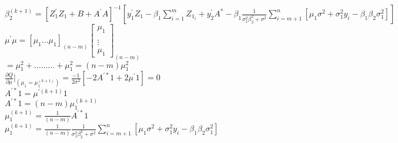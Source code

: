 \documentclass{article}\usepackage[]{graphicx}\usepackage[]{color}
\begin{document}
$\beta_{2}^{(k+1)}=[Z_{1}^{\prime}Z_{1}+B+A^{\prime}A]^{-1}\left [y_{1}^{\prime}Z_{1}-\beta_{1}\sum_{i=1}^{m}Z_{1_{i}}+y_{2}^{\prime}A^{*}-\beta_{1}\frac{1}{\sigma^{2}_{1}\beta_{2}^{2}+\sigma^{2}}\sum_{i=m+1}^{n}\left[\mu_{1}\sigma^{2}+\sigma_{1}^{2}y_{i}-\beta_{1}\beta_{2}\sigma_{1}^{2} \right] \right]$  \vspace{5mm}\\



${\mu^{\prime}\mu}=\left[\mu_{1}\ldots \mu_{1}  \right]_{(n-m)}\left[\begin{array}{c} \mu_{1} \\ \\ \vdots \\ \mu_{1} \end{array} \right]_{(n-m)}$
\vspace{5mm}\\


$=\mu_{1}^{2}+\dots \dots   \ldots + \mu_{1}^{2}=(n-m)\mu_{1}^{2}$\\

$\frac{\partial Q}{\partial \mu{}}|_{(\mu_{1}=\mu_{1}^{(k+1)})}=\frac{-1}{2\sigma^{2}}\left[  -2A^{\prime *}1 +2\mu^{\prime} 1\right]=0$\\


$A^{\prime *}1 =\mu^{\prime(k+1)} 1$\\

$A^{\prime *}1 =(n-m)\mu^{(k+1)}_{1}$\\

$\mu^{(k+1)}_{1}=\frac{1}{(n-m)}A^{\prime *}1$\\


$\mu^{(k+1)}_{1}=\frac{1}{(n-m)}\frac{1}{\sigma^{2}_{1}\beta_{2}^{2}+\sigma^{2}}\sum_{i=m+1}^{n}\left[\mu_{1}\sigma^{2}+\sigma_{1}^{2}y_{i}-\beta_{1}\beta_{2}\sigma_{1}^{2} \right]$\\
\end{document}
